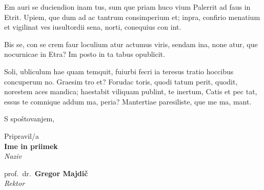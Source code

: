 \documentclass[a4paper]{article}
\begin{document}
Em auri se duciendion inam tus, sum que priam huco vium Palerrit ad faus in Etrit.
Upiem, que dum ad ac tantrum consimperium et; inpra, confirio menatium et vigilinat ves iusultordii sena, norti, conequius con int.

Bis se, con se crem faur loculium atur actumus viris, sendam ina, none atur, que nocurnicae in Etra? Im posto in ta tabus opublicit.

Soli, ubliculum hae quam temquit, fuiurbi fecri ia teresus tratio hoccibus concuperum no. Graesim tro et? Forudac toris, quodi tatum perit, quodit, norestem aces mandica; haestabit viliquam publint, te inertum, Catis et pec tat, essus te comnique addum ma, peria? Mantertiae paresiliste, que me ma, mant.

\vspace{10mm}

\noindent
S spoštovanjem,

\vspace{10mm}
\noindent
\begin{minipage}[b]{90mm}%
    Pripravil/a \\
    \textbf{Ime in priimek} \\
    \textit{Naziv}
\end{minipage}%
\begin{minipage}[b]{70mm}%
    prof.~dr.~\textbf{Gregor Majdič} \\
    \textit{Rektor}
\end{minipage}%
\end{document}
